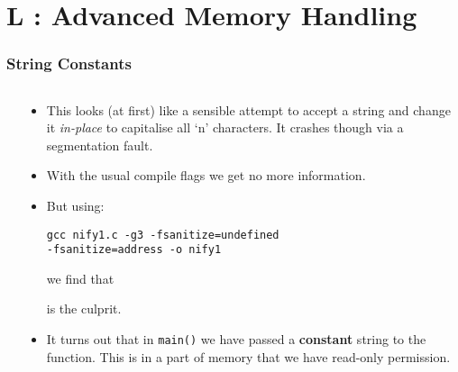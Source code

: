 \section{L : Advanced Memory Handling}
\label{chap:advmem}


\begin{frame}[fragile]
\frametitle{String Constants}
\begin{columns}[T]

\begin{column}{0.35\textwidth}

\end{column}

\pause
\begin{column}{0.55\textwidth}
\begin{itemize}[<+->]
\item This looks (at first) like a sensible attempt to accept a string and change it {\em in-place} to capitalise all `n' characters.
It crashes though via a segmentation fault.
\item With the usual compile flags we get no more information.
\item But using:
\begin{verbatim}
gcc nify1.c -g3 -fsanitize=undefined
-fsanitize=address -o nify1
\end{verbatim}
we find that

is the culprit.
\item It turns out that in \verb^main()^ we have passed a {\bf constant} string to the function. This is in a part of memory that we have read-only permission.
\end{itemize}
\end{column}

\end{columns}
\end{frame}


